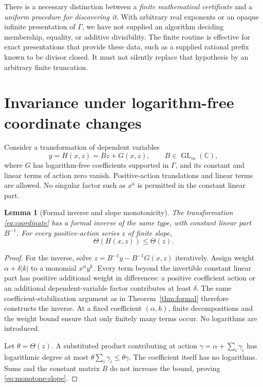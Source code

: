 \documentclass[11pt,a4paper]{article}
\numberwithin{equation}{section}
\newtheorem{lemma}[theorem]{Lemma}
\theoremstyle{definition}
\theoremstyle{remark}
\newcommand{\CC}{\mathbb C}
\newcommand{\G}{\Gamma}
\begin{document}
There is a necessary distinction between a \emph{finite mathematical
certificate} and a \emph{uniform procedure for discovering it}. With
arbitrary real exponents or an opaque infinite presentation of \(\G\),
we have not supplied an algorithm deciding membership, equality, or
additive divisibility. The finite routine is effective for exact
presentations that provide these data, such as a supplied rational
prefix known to be divisor closed. It must not silently replace that
hypothesis by an arbitrary finite truncation.

\section{Invariance under logarithm-free coordinate changes}
\label{sec:invariance}

Consider a transformation of dependent variables
\begin{equation}\label{eq:coordinate}
 y=H(x,z)=Bz+G(x,z),\qquad B\in\operatorname{GL}_m(\CC),
\end{equation}
where \(G\) has logarithm-free coefficients supported in \(\G\), and
its constant and linear terms of action zero vanish. Positive-action
translations and linear terms are allowed. No singular factor such as
\(x^a\) is permitted in the constant linear part.

\begin{lemma}[Formal inverse and slope monotonicity]\label{lem:coordinate}
The transformation \eqref{eq:coordinate} has a formal inverse of the
same type, with constant linear part \(B^{-1}\). For every
positive-action series \(z\) of finite slope,
\begin{equation}\label{eq:monotone-slope}
 \Theta(H(x,z))\le\Theta(z).
\end{equation}
\end{lemma}
\begin{proof}
For the inverse, solve
\(z=B^{-1}y-B^{-1}G(x,z)\) iteratively. Assign weight
\(\alpha+\delta|k|\) to a monomial \(x^\alpha y^k\).
Every term beyond the invertible constant linear part has positive
additional weight in differences: a positive coefficient action or
an additional dependent-variable factor contributes at least
\(\delta\). The same coefficient-stabilization argument as in
Theorem~\ref{thm:formal} therefore constructs the inverse. At a fixed
coefficient \((\alpha,k)\), finite decompositions and the weight
bound ensure that only finitely many terms occur. No logarithms are
introduced.

Let \(\theta=\Theta(z)\). A substituted product contributing at
action \(\gamma=\alpha+\sum_i\gamma_i\) has logarithmic degree at
most \(\theta\sum_i\gamma_i\le\theta\gamma\). The coefficient
itself has no logarithms. Sums and the constant matrix \(B\) do not
increase the bound, proving \eqref{eq:monotone-slope}.
\end{proof}
\end{document}
